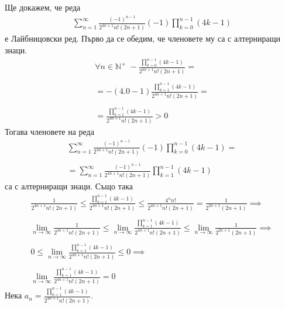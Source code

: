 \documentclass[a4paper,14pt]{extarticle}
\newcommand{\N}{\mathbb{N}}
\begin{document}
Ще докажем, че реда \begin{align*}
    \displaystyle\sum_{n = 1}^{\infty} \frac{(-1)^{n - 1}}{2^{4n + 1} n! (2n + 1)}(-1)\displaystyle\prod_{k = 0}^{n - 1}(4k - 1)
\end{align*} е Лайбницовски ред.
Първо да се обедим, че членовете му са с алтерниращи знаци.
\begin{align*}
    \forall n \in \N^+ \; -\displaystyle\frac{\displaystyle\prod_{k = 0}^{n - 1}(4k - 1)}{2^{4n + 1} n! (2n + 1)} = \\\\
    =  -(4.0 - 1)\displaystyle\frac{\displaystyle\prod_{k = 1}^{n - 1}(4k - 1)}{2^{4n + 1} n! (2n + 1)} = \\\\
    = \displaystyle\frac{\displaystyle\prod_{k = 1}^{n - 1}(4k - 1)}{2^{4n + 1} n! (2n + 1)} > 0 
\end{align*}
Тогава членовете на реда \begin{align*}
    \displaystyle\sum_{n = 1}^{\infty} \frac{(-1)^{n - 1}}{2^{4n + 1} n! (2n + 1)}(-1)\displaystyle\prod_{k = 0}^{n - 1}(4k - 1) = \\\\
    = \displaystyle\sum_{n = 1}^{\infty} \frac{(-1)^{n - 1}}{2^{4n + 1} n! (2n + 1)}\displaystyle\prod_{k = 1}^{n - 1}(4k - 1)
\end{align*}
са с алтерниращи знаци. Също така
\begin{align*}
    \frac{1}{2^{4n + 1}n!(2n + 1)} \leq \displaystyle\frac{\displaystyle\prod_{k = 1}^{n - 1}(4k - 1)}{2^{4n + 1}n!(2n + 1)} \leq \frac{4^nn!}{2^{4n + 1}n!(2n + 1)} = \frac{1}{2^{2n + 1}(2n + 1)} \implies \\\\
    \displaystyle\lim_{n \to \infty} \frac{1}{2^{4n + 1}n!(2n + 1)} \leq \displaystyle\lim_{n \to \infty} \displaystyle\frac{\displaystyle\prod_{k = 1}^{n - 1}(4k - 1)}{2^{4n + 1}n!(2n + 1)} \leq \displaystyle\lim_{n \to \infty} \frac{1}{2^{2n + 1}(2n + 1)} \implies \\\\
    0 \leq \displaystyle\lim_{n \to \infty} \displaystyle\frac{\displaystyle\prod_{k = 1}^{n - 1}(4k - 1)}{2^{4n + 1}n!(2n + 1)} \leq 0 \implies \\\\
    \displaystyle\lim_{n \to \infty} \displaystyle\frac{\displaystyle\prod_{k = 1}^{n - 1}(4k - 1)}{2^{4n + 1}n!(2n + 1)} = 0
\end{align*}
Нека $a_n = \displaystyle\frac{\displaystyle\prod_{k = 1}^{n - 1}(4k - 1)}{2^{4n + 1}n!(2n + 1)}$.
\end{document}
